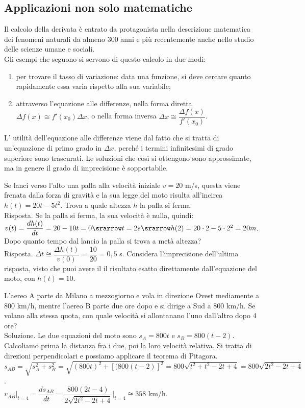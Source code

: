 \subsection{Applicazioni non solo matematiche}
Il calcolo della derivata è entrato da protagonista nella descrizione 
matematica dei fenomeni naturali da almeno $300$ anni e più recentemente
anche nello studio delle scienze umane e sociali. \\
Gli esempi che seguono si servono di questo calcolo in due modi:
\begin{enumerate}[noitemsep]
 \item per trovare il tasso di variazione:
data una funzione, si deve cercare quanto rapidamente essa varia rispetto
alla sua variabile;
 \item attraverso l'equazione alle differenze, 
nella forma diretta $\Delta f(x)\cong f'(x_0)\Delta x$, o nella forma
inversa $\Delta x \cong \dfrac{\Delta f(x)}{f'(x_0)}$.
\end{enumerate}
L' utilità dell'equazione alle differenze viene dal
fatto che si tratta di un'equazione di primo grado in $\Delta x$, perché i 
termini infinitesimi di grado superiore sono trascurati. Le soluzioni che così
si ottengono sono approssimate, ma in genere il grado di imprecisione è 
sopportabile.

\begin{esempio}
 Se lanci verso l'alto una palla alla velocità iniziale $v=20$ m/s, questa viene 
 frenata dalla forza di gravità e la sua legge del moto risulta all'incirca 
 $h(t)=20t-5t^2$. Trova a quale altezza $h$ la palla si ferma.\\
 Risposta. Se la palla si ferma, la sua velocità è nulla, quindi:\\
 $v(t)=\dfrac{dh(t)}{dt}= 20-10t=0\srarrow t=2 s \srarrow h(2)=20\cdot 2-5\cdot 
 2^2=20 m$.\\
 Dopo quanto tempo dal lancio la palla si trova a metà altezza?\\
 Risposta. $\Delta t\cong \dfrac{\Delta h(t)}{v(0)}=\dfrac{10}{20}=0,5$ s.
 Considera l'imprecisione dell'ultima risposta, visto che puoi avere il
 il risultato esatto direttamente dall'equazione del moto, con $h(t)=10$.
\end{esempio}

\begin{esempio}
L'aereo A parte da Milano a mezzogiorno e vola in direzione Ovest mediamente a 
$800$ km/h, mentre l'aereo B parte due ore dopo e si dirige a Sud a $800$ km/h.
Se volano alla stessa quota, con quale velocità si allontanano l'uno dall'altro
dopo 4 ore?\\
Soluzione. Le due equazioni del moto sono $s_A=800t$ e $s_B=800(t-2)$. 
Calcoliamo prima la distanza fra i due, poi la loro velocità relativa.
Si tratta di direzioni perpendicolari e possiamo applicare il teorema di 
Pitagora.\\
$s_{AB}=\sqrt{s_A^2+s_B^2}=\sqrt{(800t)^2+[(800(t-2)]^2}=
800\sqrt{t^2+t^2-2t+4}=800\sqrt{2t^2-2t+4}$.\\
$v_{AB}|_{t=4}=\dfrac{ds_{AB}}{dt}=\dfrac{800(2t-4)}{2\sqrt{2t^2-2t+4}}
\bigg|_{t=4}\cong 358$ km/h.
\end{esempio}

